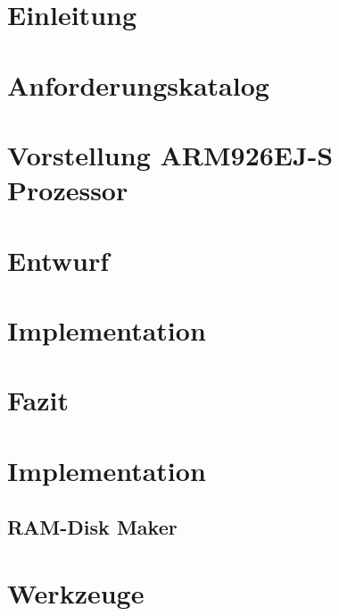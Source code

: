 \documentclass[fontsize=12pt,paper=A4,pagesize,DIV=calc,BCOR=1cm]{scrreprt}
\begin{document}
\onehalfspacing


\newpage
\thispagestyle{empty}
\mbox{}

\tableofcontents
\listoftables
\listoffigures
\lstlistoflistings
\chapter{Einleitung}

\chapter{Anforderungskatalog}

\chapter{Vorstellung ARM926EJ-S Prozessor}

\chapter{Entwurf}

\chapter{Implementation}

\chapter{Fazit}


\printbibliography[heading=bibintoc]

\appendix
{}
\chapter{Implementation}
\section{RAM-Disk Maker}

\chapter{Werkzeuge}

\end{document}
